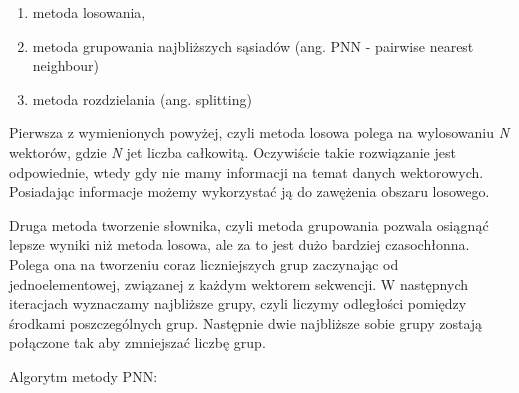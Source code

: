 \documentclass{article}
\begin{document}
\begin{enumerate}
  \item metoda losowania,
  \item metoda grupowania najbliższych sąsiadów (ang. PNN - pairwise nearest neighbour)
  \item metoda rozdzielania (ang. splitting) 
\end{enumerate}

Pierwsza z wymienionych powyżej, czyli metoda losowa polega na wylosowaniu \textit{N} wektorów, gdzie \textit{N} jet liczba całkowitą. Oczywiście takie rozwiązanie jest odpowiednie, wtedy gdy nie mamy informacji na temat danych wektorowych. Posiadając informacje możemy wykorzystać ją do zawężenia obszaru losowego.

Druga metoda tworzenie słownika, czyli metoda grupowania pozwala osiągnąć lepsze wyniki niż metoda losowa, ale za to jest dużo bardziej czasochłonna. Polega ona na tworzeniu coraz liczniejszych grup zaczynając od jednoelementowej, związanej z każdym wektorem sekwencji. W następnych iteracjach wyznaczamy najbliższe grupy, czyli liczymy odległości pomiędzy środkami poszczególnych grup. Następnie dwie najbliższe sobie grupy zostają połączone tak aby zmniejszać liczbę grup.

Algorytm metody PNN:
\end{document}
